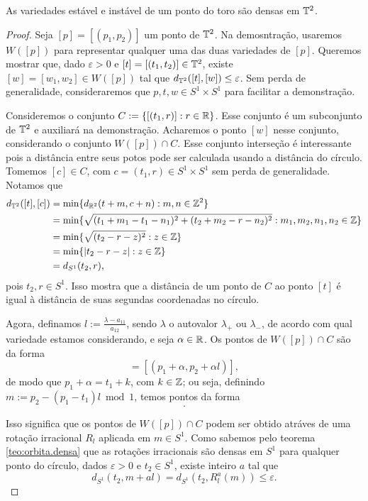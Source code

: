 \begin{proposition}
As variedades estável e instável de um ponto do toro são densas em $\mathbb{T}^2$.	\end{proposition}
\begin{proof}
Seja $[p]=[(p_1,p_2)]$ um ponto de $\mathbb{T}^2$. Na demosntração, usaremos $W([p])$ para representar qualquer uma das duas variedades de $[p]$. Queremos mostrar que, dado $\varepsilon > 0$ e $[t]=[(t_1,t_2)] \in \mathbb{T}^2$, existe $[w]=[w_1,w_2] \in W([p])$ tal que $d_{\mathbb{T}^2}([t],[w]) \leq \varepsilon$. Sem perda de generalidade, consideraremos que $p,t,w \in S^1 \times S^1$ para facilitar a demonstração.

Consideremos o conjunto $C := \{[(t_1,r)] : r \in \mathbb{R} \}$. Esse conjunto é um subconjunto de $\mathbb{T}^2$ e auxiliará na demonstração. Acharemos o ponto $[w]$ nesse conjunto, considerando o conjunto $W([p]) \cap C$. Esse conjunto interseção é interessante pois a distância entre seus potos pode ser calculada usando a distância do círculo. Tomemos $[c] \in C$, com $c=(t_1,r) \in S^1 \times S^1$ sem perda de generalidade. Notamos que
	\begin{align*}
		d_{\mathbb{T}^2}([t],[c])& = \min\{ d_{\mathbb{R}^2}(t+m,c+n) : m,n \in \mathbb{Z}^2 \} \\
			& = \min\{ \sqrt{(t_1+m_1-t_1-n_1)^2 + (t_2+m_2-r-n_2)^2} : m_1,m_2,n_1,n_2 \in \mathbb{Z} \} \\
			& = \min\{ \sqrt{(t_2-r-z)^2} : z \in \mathbb{Z} \} \\
			& = \min\{ |t_2-r-z| : z \in \mathbb{Z} \} \\
			& = d_{S^1}(t_2,r),
	\end{align*}
pois $t_2, r \in S^1$. Isso mostra que a distância de um ponto de $C$ ao ponto $[t]$ é igual à distância de suas segundas coordenadas no círculo.

Agora, definamos $l := \frac{\lambda - a_{11}}{a_{12}}$, sendo $\lambda$ o autovalor $\lambda_+$ ou $\lambda_-$, de acordo com qual variedade estamos considerando, e seja $\alpha \in \mathbb{R}$. Os pontos de $W([p]) \cap C$ são da forma
	\begin{equation*}
	[p + \alpha v_\lambda] = [(p_1 + \alpha, p_2 + \alpha l)],
	\end{equation*}
de modo que $p_1 + \alpha = t_1 + k$, com $k \in \mathbb{Z}$; ou seja, definindo $m := p_2 - (p_1 - t_1)l \bmod 1$, temos pontos da forma
	\begin{equation*}
	[(t_1,m + kl)].
	\end{equation*}

Isso significa que os pontos de $W([p]) \cap C$ podem ser obtido atráves de uma rotação irracional $R_l$ aplicada em $m \in S^1$. Como sabemos pelo teorema \ref{teo:orbita.densa} que as rotações irracionais são densas em $S^1$ para qualquer ponto do círculo, dados $\varepsilon > 0$ e $t_2 \in S^1$, existe inteiro $a$ tal que
	\begin{equation*}
	d_{S^1}(t_2,m + al) = d_{S^1}(t_2,R_l^a(m)) \leq \varepsilon \text{.}
	\end{equation*}


\end{proof}
